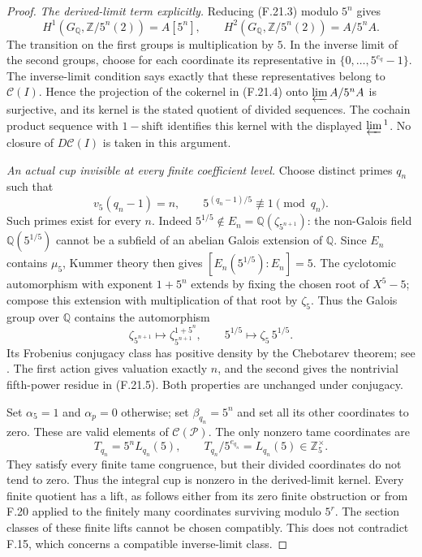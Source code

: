 \begin{proof}
\emph{The derived-limit term explicitly.}
Reducing (F.21.3) modulo $5^n$ gives
\[
 H^1(G_{\mathbb Q},\mathbb Z/5^n(2))=A[5^n],\qquad
 H^2(G_{\mathbb Q},\mathbb Z/5^n(2))=A/5^nA.
\]
The transition on the first groups is multiplication by
$5$. In the inverse limit of the second groups, choose
for each coordinate its representative in
$\{0,\ldots,5^{e_q}-1\}$. The inverse-limit condition
says exactly that these representatives belong to
$\mathcal C(I)$. Hence the projection of the cokernel
in (F.21.4) onto $\varprojlim A/5^nA$ is surjective,
and its kernel is the stated quotient of divided
sequences. The cochain product sequence with
$1-\mathrm{shift}$ identifies this kernel with the
displayed $\varprojlim{}^1$. No closure of
$D\mathcal C(I)$ is taken in this argument.

\emph{An actual cup invisible at every finite coefficient level.}
Choose distinct primes $q_n$ such that
\[
 v_5(q_n-1)=n,\qquad
                 5^{(q_n-1)/5}\not\equiv1\pmod {q_n}.
                                                        \tag{F.21.5}
\]
Such primes exist for every $n$. Indeed
$5^{1/5}\notin E_n=\mathbb Q(\zeta_{5^{n+1}})$:
the non-Galois field $\mathbb Q(5^{1/5})$ cannot be a
subfield of an abelian Galois extension of $\mathbb Q$.
Since $E_n$ contains $\mu_5$, Kummer theory then gives
$[E_n(5^{1/5}):E_n]=5$. The cyclotomic automorphism
with exponent $1+5^n$ extends by fixing the chosen
root of $X^5-5$; compose this extension with multiplication
of that root by $\zeta_5$. Thus the Galois group over
$\mathbb Q$ contains the automorphism
\[
 \zeta_{5^{n+1}}\longmapsto
        \zeta_{5^{n+1}}^{1+5^n},\qquad
          5^{1/5}\longmapsto\zeta_5\,5^{1/5}.
\]
Its Frobenius conjugacy class has positive density by
the Chebotarev theorem; see
\citet[Theorem~8.31]{FA_Milne2020ANT}.
The first action gives valuation exactly $n$, and the
second gives the nontrivial fifth-power residue in
(F.21.5). Both properties are unchanged under conjugacy.

Set $\alpha_5=1$ and $\alpha_p=0$ otherwise; set
$\beta_{q_n}=5^n$ and set all its other coordinates
to zero. These are valid elements of
$\mathcal C(\mathcal P)$. The only nonzero tame
coordinates are
\[
 T_{q_n}=5^nL_{q_n}(5),\qquad
       T_{q_n}/5^{e_{q_n}}=L_{q_n}(5)\in\mathbb Z_5^\times.
\]
They satisfy every finite tame congruence, but their
divided coordinates do not tend to zero. Thus the
integral cup is nonzero in the derived-limit kernel.
Every finite quotient has a lift, as follows either
from its zero finite obstruction or from F.20 applied
to the finitely many coordinates surviving modulo
$5^r$. The section classes of these finite lifts
cannot be chosen compatibly. This does not contradict
F.15, which concerns a compatible inverse-limit class.


\end{proof}
